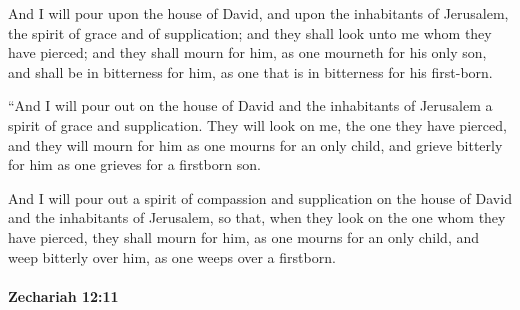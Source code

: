 			\begin{versebox}
					\item[BHS] 
					\item[LXX] 
					\item[ASV] And I will pour upon the house of David, and upon the inhabitants of Jerusalem, the spirit of grace and of supplication; and they shall look unto me whom they have pierced; and they shall mourn for him, as one mourneth for his only son, and shall be in bitterness for him, as one that is in bitterness for his first-born.
					\item[NIV] “And I will pour out on the house of David and the inhabitants of Jerusalem a spirit of grace and supplication. They will look on me, the one they have pierced, and they will mourn for him as one mourns for an only child, and grieve bitterly for him as one grieves for a firstborn son.
					\item[NRSV] And I will pour out a spirit of compassion and supplication on the house of David and the inhabitants of Jerusalem, so that, when they look on the one whom they have pierced, they shall mourn for him, as one mourns for an only child, and weep bitterly over him, as one weeps over a firstborn.
			\end{versebox}

		\paragraph{Zechariah 12:11} %
			\label{ZECHARIAH-12-11}

